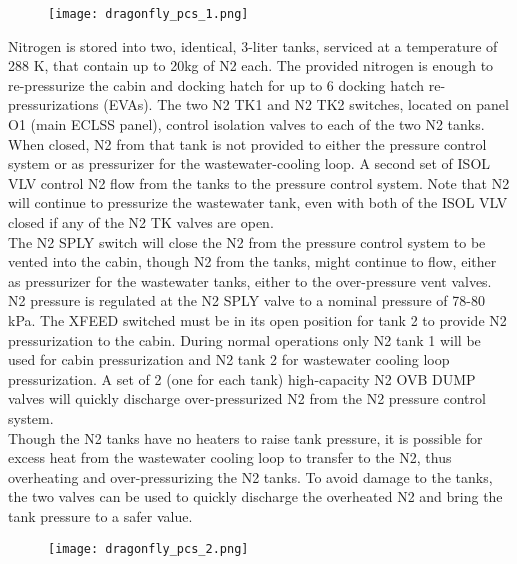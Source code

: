 \documentclass[Orbiter User Manual.tex]{subfiles}
\begin{document}
\begin{figure}[H]
  \centering
  \texttt{[image: dragonfly\_pcs\_1.png]}
\end{figure}

\noindent
Nitrogen is stored into two, identical, 3-liter tanks, serviced at a temperature of 288 K, that contain up to 20kg of N2 each. The provided nitrogen is enough to re-pressurize the cabin and docking hatch for up to 6 docking hatch re-pressurizations (EVAs). The two N2 TK1 and N2 TK2 switches, located on panel O1 (main ECLSS panel), control isolation valves to each of the two N2 tanks. When closed, N2 from that tank is not provided to either the pressure control system or as pressurizer for the wastewater-cooling loop. A second set of ISOL VLV control N2 flow from the tanks to the pressure control system. Note that N2 will continue to pressurize the wastewater tank, even with both of the ISOL VLV closed if any of the N2 TK valves are open.\\
The N2 SPLY switch will close the N2 from the pressure control system to be vented into the cabin, though N2 from the tanks, might continue to flow, either as pressurizer for the wastewater tanks, either to the over-pressure vent valves. N2 pressure is regulated at the N2 SPLY valve to a nominal pressure of 78-80 kPa. The XFEED switched must be in its open position for tank 2 to provide N2 pressurization to the cabin. During normal operations only N2 tank 1 will be used for cabin pressurization and N2 tank 2 for wastewater cooling loop pressurization. A set of 2 (one for each tank) high-capacity N2 OVB DUMP valves will quickly discharge over-pressurized N2 from the N2 pressure control system.\\
Though the N2 tanks have no heaters to raise tank pressure, it is possible for excess heat from the wastewater cooling loop to transfer to the N2, thus overheating and over-pressurizing the N2 tanks. To avoid damage to the tanks, the two valves can be used to quickly discharge the overheated N2 and bring the tank pressure to a safer value.

\begin{figure}[H]
  \centering
  \texttt{[image: dragonfly\_pcs\_2.png]}
\end{figure}
\end{document}
